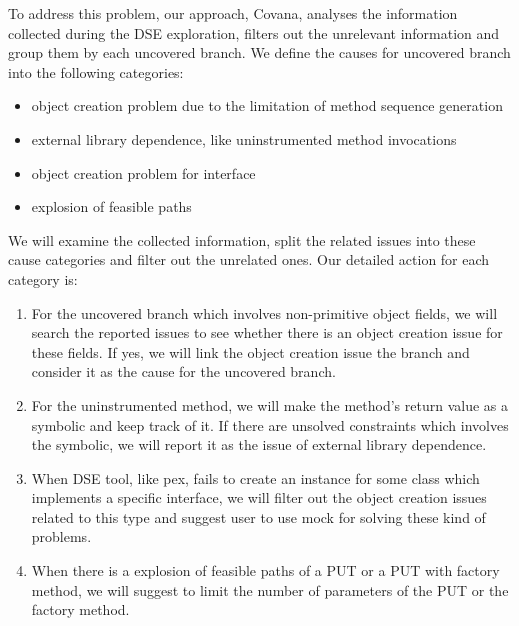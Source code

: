 To address this problem, our approach, Covana, analyses the information collected during the DSE exploration, filters out the unrelevant information and group them by each uncovered branch. We define the causes for uncovered branch into the following categories:
\begin{itemize}
	\item object creation problem due to the limitation of method sequence generation 
	\item external library dependence, like uninstrumented method invocations
	\item object creation problem for interface
	\item explosion of feasible paths
\end{itemize}
We will examine the collected information, split the related issues into these cause categories and filter out the unrelated ones.
Our detailed action for each category is:
\begin{enumerate}
\item For the uncovered branch which involves non-primitive object fields, we will search the reported issues to see whether there is an object creation issue for these fields. If yes, we will link the object creation issue the branch and consider it as the cause for the uncovered branch.
\item For the uninstrumented method, we will make the method's return value as a symbolic and keep track of it. If there are unsolved constraints which involves the symbolic, we will report it as the issue of external library dependence.
\item When DSE tool, like pex, fails to create an instance for some class which implements a specific interface, we will filter out the object creation issues related to this type and suggest user to use mock for solving these kind of problems.
\item When there is a explosion of feasible paths of a PUT or a PUT with factory method, we will suggest to limit the number of parameters of the PUT or the factory method.
\end{enumerate}

 

